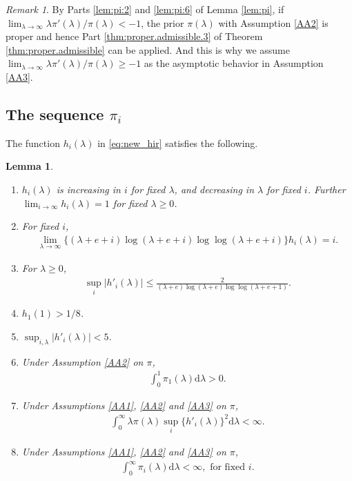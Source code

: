 \documentclass[preprint,11pt]{imsart}
\numberwithin{equation}{section}
\theoremstyle{plain}
\newtheorem{lemma}{Lemma}[section]
\theoremstyle{definition}
\theoremstyle{remark}
\newtheorem{remark}{Remark}[section]
\newcommand{\rd}{\mathrm{d}}
\begin{document}
\begin{remark}
 By Parts  \ref{lem:pi:2} and \ref{lem:pi:6} of Lemma \ref{lem:pi},
if $\lim_{\lambda\to\infty}\lambda\pi'(\lambda)/\pi(\lambda)<-1$,
the prior $\pi(\lambda)$ with Assumption \ref{AA2}
is proper and hence Part \ref{thm:proper.admissible.3} of Theorem \ref{thm:proper.admissible} can be applied. 
And this is why we assume $\lim_{\lambda\to\infty}\lambda\pi'(\lambda)/\pi(\lambda)\geq -1$
as the asymptotic behavior in Assumption \ref{AA3}.
\end{remark}

\subsection{The sequence $\pi_i$}
\label{sec:assumption_h}
The function $h_i(\lambda)$ in \eqref{eq:new_hir}
 satisfies the following.
 \begin{lemma}\label{lem:h_i}
  \begin{enumerate}
   \item \label{lem:h_i.1}
$h_i(\lambda)$ is increasing in $i$ for fixed $\lambda$, and decreasing in $\lambda$ for fixed $i$. Further
$\lim_{i\to\infty}h_i(\lambda)=1$ for fixed $\lambda\geq 0$.
   \item \label{lem:h_i.2}
	 For fixed $i$,
\begin{align*}
 \lim_{\lambda\to\infty} \{(\lambda+e+i) \log (\lambda+e+i) \log\log (\lambda+e+i)\} h_i(\lambda)=i.
\end{align*}
   \item \label{lem:h_i.4}
	 For $\lambda\geq 0$,
\begin{align*}
\sup_i |h'_i(\lambda)| \leq \frac{2}{(\lambda +e) \log (\lambda+e) \log\log (\lambda+e+1)}.
\end{align*}	 
\item \label{lem:h_i.4.5} $h_1(1)>1/8$.
\item \label{lem:h_i.4.6} $\sup_{i,\lambda} |h'_i(\lambda)|<5$.
   \item \label{lem:h_i.4.75} Under Assumption \ref{AA2} on $\pi$,
\begin{align*}
 \int_0^1 \pi_1(\lambda)\rd \lambda>0.
\end{align*}
   \item \label{lem:h_i.5}
	 Under Assumptions \ref{AA1},  \ref{AA2} and \ref{AA3} on $\pi$,
\begin{align*}
 \int_0^\infty \lambda \pi(\lambda)\sup_i\{h'_i(\lambda)\}^2   \rd  \lambda <\infty.
\end{align*}
   \item \label{lem:h_i.6}
	 Under Assumptions \ref{AA1}, \ref{AA2} and \ref{AA3} on $\pi$, 
\begin{align*}
 \int_0^\infty  \pi_i(\lambda)   \rd  \lambda <\infty,\text{ for fixed }i.
\end{align*}
  \end{enumerate}
 \end{lemma}
\end{document}
